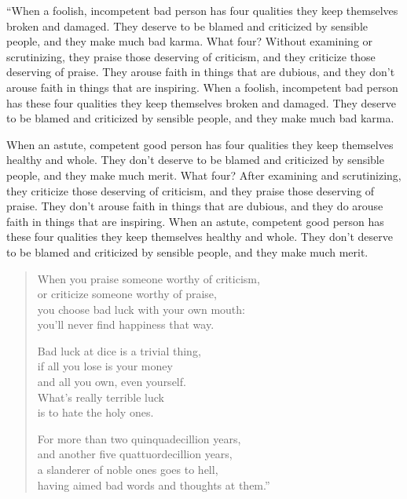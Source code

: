 \documentclass[12pt,openany]{book}%
\begin{document}
“When a foolish, incompetent bad person has four qualities they keep themselves broken and damaged. They deserve to be blamed and criticized by sensible people, and they make much bad karma. What four? Without examining or scrutinizing, they praise those deserving of criticism, and they criticize those deserving of praise. They arouse faith in things that are dubious, and they don’t arouse faith in things that are inspiring. When a foolish, incompetent bad person has these four qualities they keep themselves broken and damaged. They deserve to be blamed and criticized by sensible people, and they make much bad karma. 

When an astute, competent good person has four qualities they keep themselves healthy and whole. They don’t deserve to be blamed and criticized by sensible people, and they make much merit. What four? After examining and scrutinizing, they criticize those deserving of criticism, and they praise those deserving of praise. They don’t arouse faith in things that are dubious, and they do arouse faith in things that are inspiring. When an astute, competent good person has these four qualities they keep themselves healthy and whole. They don’t deserve to be blamed and criticized by sensible people, and they make much merit. 

\begin{verse}%
When you praise someone worthy of criticism, \\
or criticize someone worthy of praise, \\
you choose bad luck with your own mouth: \\
you’ll never find happiness that way. 

Bad luck at dice is a trivial thing, \\
if all you lose is your money \\
and all you own, even yourself. \\
What’s really terrible luck \\
is to hate the holy ones. 

For more than two quinquadecillion years, \\
and another five quattuordecillion years, \\
a slanderer of noble ones goes to hell, \\
having aimed bad words and thoughts at them.” 

%
\end{verse}
\end{document}
